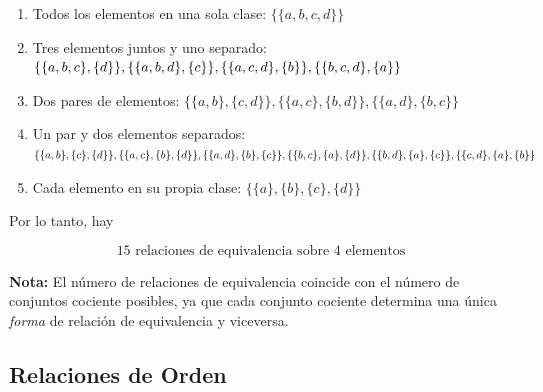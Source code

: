 \documentclass[a4paper,12pt]{article}
\begin{document}
\begin{ejercicio}[title=Ejercicio 15]
\begin{enumerate}
\item Todos los elementos en una sola clase: \(\{ \{a,b,c,d\} \}\)
\item Tres elementos juntos y uno separado: 
\(\{ \{a,b,c\}, \{d\} \}, \{ \{a,b,d\}, \{c\} \}, \\
\{ \{a,c,d\}, \{b\} \}, \{ \{b,c,d\}, \{a\} \}\)
\item Dos pares de elementos: 
\(\{ \{a,b\}, \{c,d\} \}, \{ \{a,c\}, \{b,d\} \}, \{ \{a,d\}, \{b,c\} \}\)
\item Un par y dos elementos separados: 
\(\{ \{a,b\}, \{c\}, \{d\} \}, \{ \{a,c\}, \{b\}, \{d\} \}, \\
\{ \{a,d\}, \{b\}, \{c\} \}, \{ \{b,c\}, \{a\}, \{d\} \}, \{ \{b,d\}, \{a\}, \{c\} \}, \{ \{c,d\}, \{a\}, \{b\} \}\)
\item Cada elemento en su propia clase: \(\{ \{a\}, \{b\}, \{c\}, \{d\} \}\)
\end{enumerate}

Por lo tanto, hay

\[
\boxed{15 \text{ relaciones de equivalencia sobre 4 elementos}}
\]

\textbf{Nota:} El número de relaciones de equivalencia coincide con el número de conjuntos cociente posibles, ya que cada conjunto cociente determina una única \textit{forma} de relación de equivalencia y viceversa.

\end{ejercicio}

\subsection{Relaciones de Orden}
\end{document}
